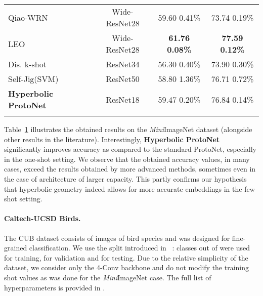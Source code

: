 \documentclass[10pt,twocolumn,letterpaper]{article}
\begin{document}
\begin{table}[t]
{\begin{tabular}{l|c c c}
Qiao-WRN~\cite{qiao2018few_shot_activations}   &    Wide-ResNet28& 59.60  0.41\%   & 73.74  0.19\%            \\ LEO~\cite{rusu2018LEO}        & Wide-ResNet28& \textbf{61.76  0.08\%}   & \textbf{77.59  0.12\%}                \\
Dis. k-shot~\cite{bauer2017discriminative_k_shot} & ResNet34  & 56.30  0.40\%   & 73.90  0.30\%       \\ Self-Jig(SVM)~\cite{chen2019aug_few_shot}     &   ResNet50& 58.80  1.36\%   & 76.71  0.72\%             \\ \hline
\textbf{Hyperbolic ProtoNet} & ResNet18 & 59.47  0.20\%& 76.84  0.14\%\\
\Xhline{3\arrayrulewidth}
\end{tabular}
}
\vspace{-5mm}
\label{tab:min_final}
\end{table} 



Table~\ref{tab:min_final} illustrates the obtained results on the \textit{Mini}ImageNet dataset (alongside other results in the literature). Interestingly, \textbf{Hyperbolic ProtoNet} significantly improves accuracy as compared to the standard ProtoNet, especially in the one-shot setting. We observe that the obtained accuracy values, in many cases, exceed the results obtained by more advanced methods, sometimes even in the case of architecture of larger capacity. This partly confirms our hypothesis that hyperbolic geometry indeed allows for more accurate embeddings in the few--shot setting.



\paragraph{Caltech-UCSD Birds.}
The CUB dataset consists of  images of  bird species and was designed for fine-grained classification. We use the split introduced in ~\cite{triantafillou2017few}:  classes out of  were used for training,  for validation and  for testing. Due to the relative simplicity of the dataset, we consider only the 4-Conv backbone and do not modify the training shot values as was done for the \textit{Mini}ImageNet case. The full list of hyperparameters is provided in . 
\end{document}
